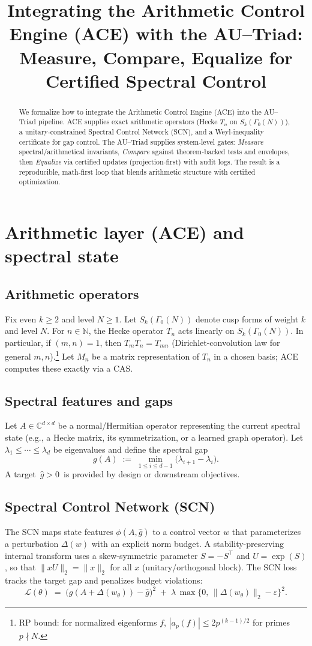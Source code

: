 \documentclass[11pt]{article}
\title{Integrating the Arithmetic Control Engine (ACE) with the AU--Triad:\\
Measure, Compare, Equalize for Certified Spectral Control}
\author{}
\date{}
\newcommand{\C}{\mathbb{C}}
\begin{document}
\maketitle

\begin{abstract}
We formalize how to integrate the Arithmetic Control Engine (ACE) into the AU--Triad pipeline. 
ACE supplies exact arithmetic operators (Hecke $T_n$ on $S_k(\Gamma_0(N))$), a unitary-constrained Spectral Control Network (SCN), and a Weyl-inequality certificate for gap control. The AU--Triad supplies system-level gates: \emph{Measure} spectral/arithmetical invariants, \emph{Compare} against theorem-backed tests and envelopes, then \emph{Equalize} via certified updates (projection-first) with audit logs. The result is a reproducible, math-first loop that blends arithmetic structure with certified optimization.
\end{abstract}

\section{Arithmetic layer (ACE) and spectral state}
\subsection{Arithmetic operators}
Fix even $k\ge 2$ and level $N\ge 1$. Let $S_k(\Gamma_0(N))$ denote cusp forms of weight $k$ and level $N$. 
For $n\in\mathbb{N}$, the Hecke operator $T_n$ acts linearly on $S_k(\Gamma_0(N))$. 
In particular, if $(m,n)=1$, then $T_mT_n=T_{mn}$ (Dirichlet-convolution law for general $m,n$).\footnote{RP bound: for normalized eigenforms $f$, $|a_p(f)|\le 2p^{(k-1)/2}$ for primes $p\nmid N$.}
Let $M_n$ be a matrix representation of $T_n$ in a chosen basis; ACE computes these exactly via a CAS.

\subsection{Spectral features and gaps}
Let $A\in\C^{d\times d}$ be a normal/Hermitian operator representing the current spectral state (e.g., a Hecke matrix, its symmetrization, or a learned graph operator). 
Let $\lambda_1\le \cdots \le \lambda_d$ be eigenvalues and define the spectral gap
\[
g(A)\;:=\;\min_{1\le i\le d-1}\big(\lambda_{i+1}-\lambda_i\big).
\]
A target $\,\hat g>0\,$ is provided by design or downstream objectives.

\subsection{Spectral Control Network (SCN)}
The SCN maps state features $\phi(A,\hat g)$ to a control vector $w$ that parameterizes a perturbation $\Delta(w)$ with an explicit norm budget. A stability-preserving internal transform uses a skew-symmetric parameter $S=-S^\top$ and $U=\exp(S)$, so that $\|xU\|_2=\|x\|_2$ for all $x$ (unitary/orthogonal block). The SCN loss tracks the target gap and penalizes budget violations:
\[
\mathcal{L}(\theta)\;=\; \big(g(A+\Delta(w_\theta))-\hat g\big)^2
\;+\;\lambda\,\max\{0,\,\|\Delta(w_\theta)\|_2-\varepsilon\}^2.
\]
\end{document}
